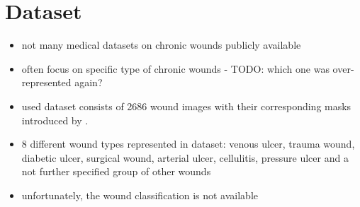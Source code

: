 \section{Dataset}

\begin{itemize}
	\item not many medical datasets on chronic wounds publicly available \cite{Oota_2023_WACV}
	\item often focus on specific type of chronic wounds - TODO: which one was over-represented again?
	\item used dataset consists of 2686 wound images with their corresponding masks introduced by \citeauthor{Oota_2023_WACV} \cite{Oota_2023_WACV}.
	\item 8 different wound types represented in dataset: venous ulcer, trauma wound, diabetic ulcer, surgical wound, arterial ulcer, cellulitis, pressure ulcer and a not further specified group of other wounds
	\item unfortunately, the wound classification is not available
\end{itemize}
